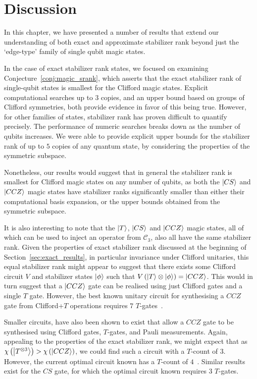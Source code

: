 \section{Discussion}\label{sec:srank_discussion}
In this chapter, we have presented a number of results that extend our understanding of both exact and approximate stabilizer rank beyond just the `edge-type' family of single qubit magic states.\par
In the case of exact stabilizer rank states, we focused on examining Conjecture~\ref{conj:magic_srank}, which asserts that the exact stabilizer rank of single-qubit states is smallest for the Clifford magic states. Explicit computational searches up to $3$ copies, and an upper bound based on groups of Clifford symmetries, both provide evidence in favor of this being true.
However, for other families of states, stabilizer rank has proven difficult to quantify precisely. The performance of numeric searches breaks down as the number of qubits increases. We were able to provide explicit upper bounds for the stabilizer rank of up to $5$ copies of any quantum state, by considering the properties of the symmetric subspace.\par
Nonetheless, our results would suggest that in general the stabilizer rank is smallest for Clifford magic states on any number of qubits, as both the $\ket{CS}$ and $\ket{CCZ}$ magic states have stabilizer ranks significantly smaller than either their computational basis expansion, or the upper bounds obtained from the symmetric subspace.\par
It is also interesting to note that the $\ket{T}$, $\ket{CS}$ and $\ket{CCZ}$ magic states, all of which can be used to inject an operator from $\mathcal{C}_{3}$, also all have the same stabilizer rank. Given the properties of exact stabilizer rank discussed at the beginning of Section~\ref{sec:exact_results}, in particular invariance under Clifford unitaries, this equal stabilizer rank might appear to suggest that there exists some Clifford circuit $V$ and stabilizer states $\ket{\phi}$ such that $V\left(\ket{T}\otimes\ket{\phi}\right)=\ket{CCZ}$. This would in turn suggest that a $\ket{CCZ}$ gate can be realised using just Clifford gates and a single $T$ gate. However, the best known unitary circuit for synthesising a $CCZ$ gate from Clifford+$T$ operations requires $7$ $T$-gates~\cite{Nielsen2000}.\par
Smaller circuits, have also been shown to exist that allow a $CCZ$ gate to be synthesised using Clifford gates, $T$-gates, and Pauli measurements. Again, appealing to the properties of the exact stabilizer rank, we might expect that as $\chi\left(\ket{T^{\otimes 3}}\right)>\chi\left(\ket{CCZ}\right)$, we could find such a circuit with a $T$-count of $3$. However, the current optimal circuit known has a $T$-count of $4$~\cite{Jones2013}. Similar results exist for the $CS$ gate, for which the optimal circuit known requires $3$ $T$-gates.\par

